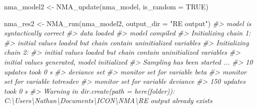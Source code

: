 \documentclass[
]{article}
\newenvironment{Shaded}{\begin{snugshade}}{\end{snugshade}}
\newcommand{\AttributeTok}[1]{\textcolor[rgb]{0.77,0.63,0.00}{#1}}
\newcommand{\CommentTok}[1]{\textcolor[rgb]{0.56,0.35,0.01}{\textit{#1}}}
\newcommand{\ConstantTok}[1]{\textcolor[rgb]{0.00,0.00,0.00}{#1}}
\newcommand{\FunctionTok}[1]{\textcolor[rgb]{0.00,0.00,0.00}{#1}}
\newcommand{\NormalTok}[1]{#1}
\newcommand{\OtherTok}[1]{\textcolor[rgb]{0.56,0.35,0.01}{#1}}
\newcommand{\StringTok}[1]{\textcolor[rgb]{0.31,0.60,0.02}{#1}}
\begin{document}
\begin{Shaded}
\begin{Highlighting}[]
\NormalTok{nma\_model2 }\OtherTok{\textless{}{-}}
  \FunctionTok{NMA\_update}\NormalTok{(nma\_model,}
             \AttributeTok{is\_random =} \ConstantTok{TRUE}\NormalTok{)}

\NormalTok{nma\_res2 }\OtherTok{\textless{}{-}} \FunctionTok{NMA\_run}\NormalTok{(nma\_model2,}
                    \AttributeTok{output\_dir =} \StringTok{"RE output"}\NormalTok{)}
\CommentTok{\#\textgreater{} model is syntactically correct}
\CommentTok{\#\textgreater{} data loaded}
\CommentTok{\#\textgreater{} model compiled}
\CommentTok{\#\textgreater{} Initializing chain 1:}
\CommentTok{\#\textgreater{} initial values loaded but chain contain uninitialized variables}
\CommentTok{\#\textgreater{} Initializing chain 2:}
\CommentTok{\#\textgreater{} initial values loaded but chain contain uninitialized variables}
\CommentTok{\#\textgreater{} initial values generated, model initialized}
\CommentTok{\#\textgreater{} Sampling has been started ...}
\CommentTok{\#\textgreater{} 10 updates took 0 s}
\CommentTok{\#\textgreater{} deviance set}
\CommentTok{\#\textgreater{} monitor set for variable \textquotesingle{}beta\textquotesingle{}}
\CommentTok{\#\textgreater{} monitor set for variable \textquotesingle{}totresdev\textquotesingle{}}
\CommentTok{\#\textgreater{} monitor set for variable \textquotesingle{}deviance\textquotesingle{}}
\CommentTok{\#\textgreater{} 150 updates took 0 s}
\CommentTok{\#\textgreater{} Warning in dir.create(path = here(folder)): \textquotesingle{}C:\textbackslash{}Users\textbackslash{}Nathan\textbackslash{}Documents\textbackslash{}ICON\textbackslash{}NMA\textbackslash{}RE output\textquotesingle{} already exists}


\end{Highlighting}
\end{Shaded}
\end{document}
